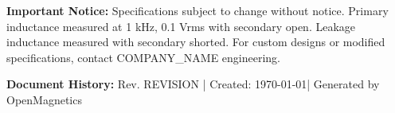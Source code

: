 \documentclass[10pt,a4paper]{article}
\begin{document}
\begin{tcolorbox}[
    colback=warning!10,
    colframe=warning!50,
    boxrule=0.3pt,
    arc=1mm,
    left=3mm,
    right=3mm,
    top=2mm,
    bottom=2mm
]
{\footnotesize\color{textdark}
\textbf{Important Notice:} Specifications subject to change without notice. Primary inductance measured at 1 kHz, 0.1 Vrms with secondary open. Leakage inductance measured with secondary shorted. For custom designs or modified specifications, contact {{COMPANY_NAME}} engineering.
}
\end{tcolorbox}

\vspace{2mm}
{\footnotesize\color{textmuted}
\textbf{Document History:} Rev. {{REVISION}} | Created: \today | Generated by OpenMagnetics
}

\label{LastPage}
\end{document}
